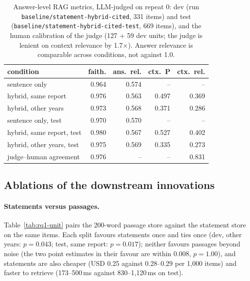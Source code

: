 \documentclass[11pt]{article}
\newcommand{\run}[1]{\nolinkurl{#1}}
\begin{document}
\begin{table}[t]
\centering\scriptsize
\setlength{\tabcolsep}{3pt}
\begin{tabular}{@{}lrrrr@{}}
\toprule
condition & faith. & ans.\ rel. & ctx.\ P & ctx.\ rel. \\
\midrule
sentence only & 0.964 & 0.574 & -- & -- \\
hybrid, same report & 0.976 & 0.563 & 0.497 & 0.369 \\
hybrid, other years & 0.973 & 0.568 & 0.371 & 0.286 \\
\midrule
sentence only, test & 0.970 & 0.570 & -- & -- \\
hybrid, same report, test & 0.980 & 0.567 & 0.527 & 0.402 \\
hybrid, other years, test & 0.975 & 0.569 & 0.335 & 0.273 \\
\midrule
judge--human agreement & 0.976 & -- & -- & 0.831 \\
\bottomrule
\end{tabular}
\caption{Answer-level RAG metrics, LLM-judged on repeat 0: dev (run \run{baseline/statement-hybrid-cited}, 331 items) and test (\run{baseline/statement-hybrid-cited-test}, 669 items), and the human calibration of the judge (127 + 59 dev units; the judge is lenient on context relevance by 1.7$\times$). Answer relevance is comparable across conditions, not against 1.0.}
\label{tab:ragas}
\end{table}

\subsection{Ablations of the downstream innovations}
\label{sec:rq1-ablation}

\paragraph{Statements versus passages.}
\label{sec:rq1-unit}
Table~\ref{tab:rq1-unit} pairs the 200-word passage store against the statement store on the same items. Each split favours statements once and ties once (dev, other years: $p = 0.043$; test, same report: $p = 0.017$); neither favours passages beyond noise (the two point estimates in their favour are within 0.008, $p = 1.00$), and statements are also cheaper (USD 0.25 against 0.28--0.29 per 1,000 items) and faster to retrieve (173--500\,ms against 830--1,120\,ms on test).
\end{document}
